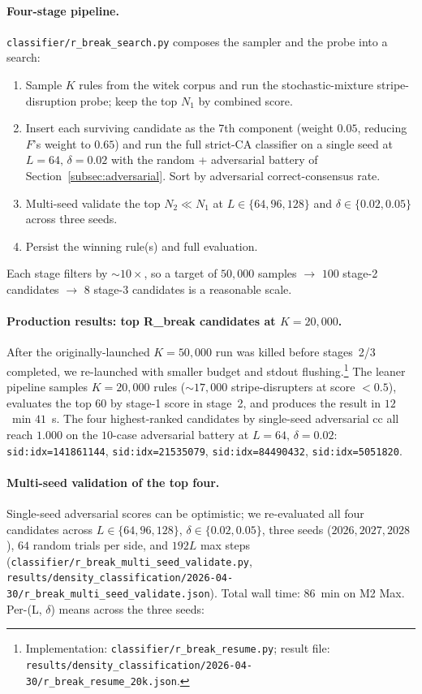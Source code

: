 \documentclass[11pt,a4paper]{article}
\newcommand{\sid}[1]{\texttt{sid:}\allowbreak\texttt{#1}}
\newcommand{\fpath}[1]{\nolinkurl{#1}}
\begin{document}
\paragraph{Four-stage pipeline.}
\fpath{classifier/r_break_search.py} composes the sampler and the
probe into a search:
\begin{enumerate}
\item Sample \(K\) rules from the witek corpus and run the
  stochastic-mixture stripe-disruption probe; keep the top
  \(N_1\) by combined score.
\item Insert each surviving candidate as the 7th component
  (weight \(0.05\), reducing \(F\)'s weight to \(0.65\)) and run the
  full strict-CA classifier on a single seed at \(L=64,\,\delta=0.02\)
  with the random + adversarial battery of
  Section~\ref{subsec:adversarial}.  Sort by adversarial
  correct-consensus rate.
\item Multi-seed validate the top \(N_2 \ll N_1\) at
  \(L\in\{64, 96, 128\}\) and \(\delta\in\{0.02, 0.05\}\) across
  three seeds.
\item Persist the winning rule(s) and full evaluation.
\end{enumerate}

Each stage filters by \({\sim}10\times\), so a target of \(50{,}000\)
samples \(\to\) \(100\) stage-2 candidates \(\to\) \(8\) stage-3
candidates is a reasonable scale.

\paragraph{Production results: top R\_break candidates at \(K = 20{,}000\).}
After the originally-launched \(K = 50{,}000\) run was killed before
stages~2/3 completed, we re-launched with smaller budget and stdout
flushing.\footnote{Implementation:
\fpath{classifier/r_break_resume.py};
result file:
\fpath{results/density_classification/2026-04-30/r_break_resume_20k.json}.}
The leaner pipeline samples \(K = 20{,}000\) rules (\({\sim}\!17{,}000\)
stripe-disrupters at score \(<0.5\)), evaluates the top \(60\) by
stage-1 score in stage~2, and produces the result in \(12\)~min
\(41\)~s.  The four highest-ranked candidates by single-seed
adversarial cc all reach \(1.000\) on the \(10\)-case adversarial
battery at \(L=64,\,\delta=0.02\):
\sid{idx=141861144}, \sid{idx=21535079}, \sid{idx=84490432},
\sid{idx=5051820}.

\paragraph{Multi-seed validation of the top four.}
Single-seed adversarial scores can be optimistic; we re-evaluated
all four candidates across \(L \in \{64, 96, 128\}\), \(\delta \in
\{0.02, 0.05\}\), three seeds (\(2026, 2027, 2028\)),
\(64\) random trials per side, and \(192L\) max steps
(\fpath{classifier/r_break_multi_seed_validate.py},
\fpath{results/density_classification/2026-04-30/r_break_multi_seed_validate.json}).
Total wall time: \(86\)~min on M2 Max.  Per-(L, \(\delta\)) means
across the three seeds:
\end{document}

